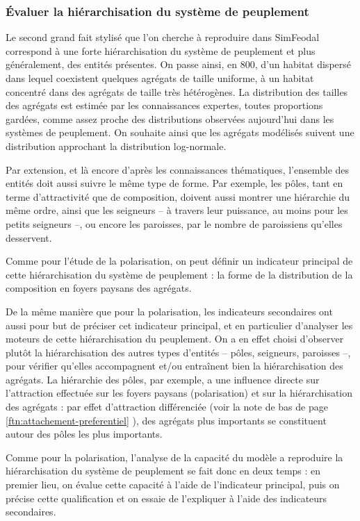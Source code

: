 \subsubsection{Évaluer la hiérarchisation du système de peuplement}

Le second grand fait stylisé que l'on cherche à reproduire dans SimFeodal correspond à une forte hiérarchisation du système de peuplement et plus généralement, des entités présentes. On passe ainsi, en 800, d'un habitat dispersé dans lequel coexistent quelques agrégats de taille uniforme, à un habitat concentré dans des agrégats de taille très hétérogènes. La distribution des tailles des agrégats est estimée par les connaissances expertes, toutes proportions gardées, comme assez proche des distributions observées aujourd'hui dans les systèmes de peuplement.
On souhaite ainsi que les agrégats modélisés suivent une distribution approchant la distribution log-normale.

Par extension, et là encore d'après les connaissances thématiques, l'ensemble des entités doit aussi suivre le même type de forme. Par exemple, les pôles, tant en terme d'attractivité que de composition, doivent aussi montrer une hiérarchie du même ordre, ainsi que les seigneurs -- à travers leur puissance, au moins pour les petits seigneurs --, ou encore les paroisses, par le nombre de paroissiens qu'elles desservent.

Comme pour l'étude de la polarisation, on peut définir un indicateur principal de cette hiérarchisation du système de peuplement : la forme de la distribution de la composition en foyers paysans des agrégats.

De la même manière que pour la polarisation, les indicateurs secondaires ont aussi pour but de préciser cet indicateur principal, et en particulier d'analyser les moteurs de cette hiérarchisation du peuplement.
On a en effet choisi d'observer plutôt la hiérarchisation des autres types d'entités -- pôles, seigneurs, paroisses --, pour vérifier qu'elles accompagnent et/ou entraînent bien la hiérarchisation des agrégats. La hiérarchie des pôles, par exemple, a une influence directe sur l'attraction effectuée sur les foyers paysans (polarisation) et sur la hiérarchisation des agrégats : par effet d'attraction différenciée (voir la note de bas de page \ref{ftn:attachement-preferentiel} ), des agrégats plus importants se constituent autour des pôles les plus importants.

Comme pour la polarisation, l'analyse de la capacité du modèle a reproduire la hiérarchisation du système de peuplement se fait donc en deux temps : en premier lieu, on évalue cette capacité à l'aide de l'indicateur principal, puis on précise cette qualification et on essaie de l'expliquer à l'aide des indicateurs secondaires.


